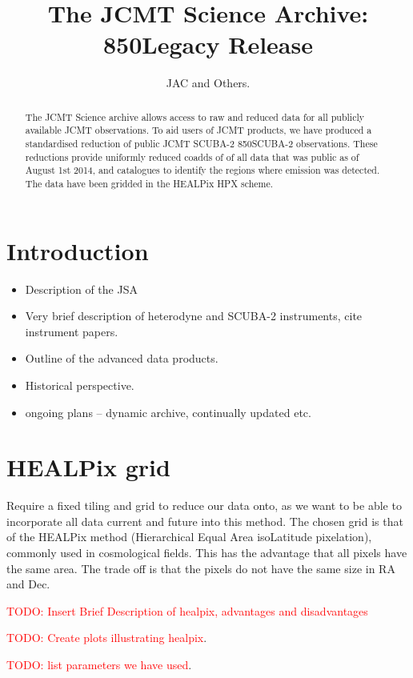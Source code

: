 \documentclass[usenatbib]{mn2e}
\title{The JCMT Science Archive: 850\micron Legacy Release}
\author{JAC and Others.}
\newcommand{\todo}[1]{\textcolor{red}{TODO: #1}}
\begin{document}
\maketitle

\begin{abstract}

  The JCMT Science archive allows access to raw and reduced data for
  all publicly available JCMT observations. To aid users of JCMT
  products, we have produced a standardised reduction of public JCMT
  SCUBA-2 850\micron SCUBA-2 observations. These reductions provide
  uniformly reduced coadds of of all data that was public as of August
  1st 2014, and catalogues to identify the regions where emission was
  detected. The data have been gridded in the HEALPix HPX scheme.
\end{abstract}

\section{Introduction}
\begin{itemize}
\item Description of the JSA \citep{2015Economou}
\item Very brief description of heterodyne and SCUBA-2 instruments, cite instrument papers.
\item Outline of the advanced data products.
\item Historical perspective.
\item ongoing plans -- dynamic archive, continually updated etc.
\end{itemize}



\section{HEALPix grid }
Require a fixed tiling and grid to reduce our data onto, as we want to be able to
incorporate all data current and future into this method. The chosen
grid is that of the HEALPix method (Hierarchical Equal Area
isoLatitude pixelation), commonly used in cosmological fields. This
has the advantage that all pixels have the same area. The trade off is
that the pixels do not have the same size in RA and Dec.

\todo{Insert Brief Description of healpix, advantages and
  disadvantages}

\todo{Create plots illustrating healpix}.

\todo{list parameters we have used}.
\end{document}

